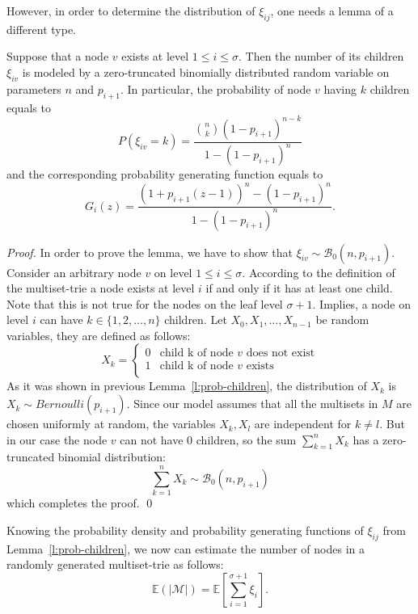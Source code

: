 However, in order to determine the distribution of $\xi_{ij}$, one needs a lemma of a different type.

\begin{lemma}\label{l:prob-children}
Suppose that a node $v$ exists at level $1\leq i\leq\sigma$.
Then the number of its children $\xi_{iv}$ is modeled by a zero-truncated binomially
distributed random variable on parameters $n$ and $p_{i+1}$. In particular,
the probability of node $v$ having $k$ children equals to
\begin{equation}\label{eq:pdf}
P(\xi_{iv} = k) = \frac{\binom{n}{k} (1-p_{i+1})^{n-k}}{1-(1-p_{i+1})^n}
\end{equation}
and the corresponding probability generating function equals to
\begin{equation}\label{eq:generating_func}
G_i(z) = \frac{(1+p_{i+1}(z-1))^n - (1-p_{i+1})^n}{1-(1-p_{i+1})^n}.
\end{equation}
\end{lemma}
\begin{proof}
In order to prove the lemma, we have to show that
$\xi_{iv}\sim\mathcal{B}_0(n, p_{i+1}).$
Consider an arbitrary node $v$ on level $1\leq i\leq\sigma.$ According to the
definition of the multiset-trie a node exists at level $i$ if and only if
it has at least one child. Note that this is not true for the nodes on the leaf
level $\sigma + 1.$ Implies, a node on level $i$ can have
$k\in\{ 1,2,\ldots, n\}$ children. Let $X_0, X_1, \ldots, X_{n-1}$ be random
variables, they are defined as follows:
\[
X_k = \begin{cases}
0 & \textrm{child k of node $v$ does not exist} \\
1 & \textrm{child k of node $v$ exists} \\
\end{cases}
\]
As it was shown in previous Lemma~\ref{l:prob-children}, the distribution of 
$X_k$ is $X_k\sim Bernoulli(p_{i+1}).$ Since our model assumes that all the 
multisets in $M$ are chosen uniformly at random, the variables 
$X_k,X_l$ are independent for $k\neq l.$ But in our case the node $v$ can not 
have 0 children, so the sum $\sum_{k=1}^n X_k$ has a zero-truncated binomial 
distribution:
%
\[
\sum_{k=1}^n X_k \sim\mathcal{B}_0(n,p_{i+1})
\]
%
which completes the proof.
\hspace*{\fill}\qed
\end{proof}
%
Knowing the probability density and probability generating functions of $\xi_{ij}$ 
from Lemma~\ref{l:prob-children}, we now can estimate the number of nodes in 
a randomly generated multiset-trie as follows:
%
\begin{equation}\label{eq:num_nodes}
\mathbb{E}( | \mathcal{M} | ) = \mathbb{E}\left[ \sum_{i=1}^{\sigma+1} \xi_i \right].
\end{equation}
%

